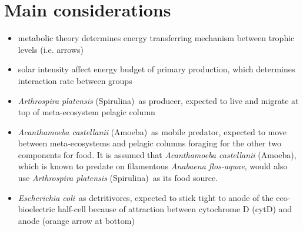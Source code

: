 \documentclass[a4paper,11pt]{article}
\newcommand{\ec}{\textit{Escherichia coli}}
\newcommand{\am}{\textit{Acanthamoeba castellanii} (Amoeba)}
\newcommand{\ap}{\textit{Arthrospira platensis} (Spirulina)}
\begin{document}
    \section{Main considerations}
    \begin{itemize}
        \item metabolic theory\autocite{schramski2015metabolic} determines energy transferring mechanism between trophic levels (i.e. arrows)
        \item solar intensity affect energy budget of primary production, which determines interaction rate between groups
        \item \ap\ as producer\autocite{usharani2012spirulina}, expected to live and migrate at top of meta-ecosystem pelagic column
        \item \am\ as mobile predator\autocite{gonccalves2018extracellular,wright1981acanthamoeba}, expected to move between meta-ecosystems and pelagic columns foraging for the other two components for food.  It is assumed that \am, which is known to predate on filamentous \textit{Anabaena flos-aquae}\autocite{wright1981acanthamoeba}, would also use \ap\ as its food source.
        \item \ec\ as detritivores\autocite{edwards2000escherichia}, expected to stick tight to anode of the eco-bioelectric half-cell because of attraction between cytochrome D (cytD)\autocite{gennis1987cytochromes,rhieu2009direct} and anode (orange arrow at bottom)
    \end{itemize}
    
\end{document}
